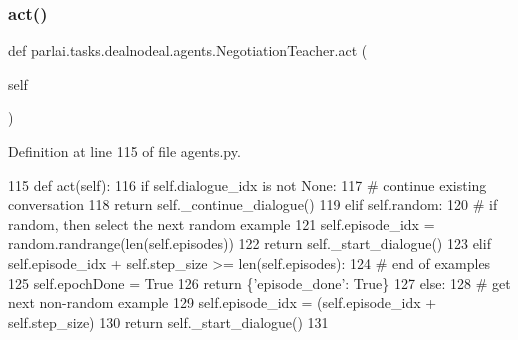 \subsubsection{\texorpdfstring{act()}{act()}}
{\footnotesize\ttfamily def parlai.\+tasks.\+dealnodeal.\+agents.\+Negotiation\+Teacher.\+act (\begin{DoxyParamCaption}\item[{}]{self }\end{DoxyParamCaption})}



Definition at line 115 of file agents.\+py.


\begin{DoxyCode}
115     \textcolor{keyword}{def }act(self):
116         \textcolor{keywordflow}{if} self.dialogue\_idx \textcolor{keywordflow}{is} \textcolor{keywordflow}{not} \textcolor{keywordtype}{None}:
117             \textcolor{comment}{# continue existing conversation}
118             \textcolor{keywordflow}{return} self.\_continue\_dialogue()
119         \textcolor{keywordflow}{elif} self.random:
120             \textcolor{comment}{# if random, then select the next random example}
121             self.episode\_idx = random.randrange(len(self.episodes))
122             \textcolor{keywordflow}{return} self.\_start\_dialogue()
123         \textcolor{keywordflow}{elif} self.episode\_idx + self.step\_size >= len(self.episodes):
124             \textcolor{comment}{# end of examples}
125             self.epochDone = \textcolor{keyword}{True}
126             \textcolor{keywordflow}{return} \{\textcolor{stringliteral}{'episode\_done'}: \textcolor{keyword}{True}\}
127         \textcolor{keywordflow}{else}:
128             \textcolor{comment}{# get next non-random example}
129             self.episode\_idx = (self.episode\_idx + self.step\_size) %
130             \textcolor{keywordflow}{return} self.\_start\_dialogue()
131 
\end{DoxyCode}
\mbox{\label{classparlai_1_1tasks_1_1dealnodeal_1_1agents_1_1NegotiationTeacher_a87d200e80614ec6ac4b7611d698f22f5}} 
